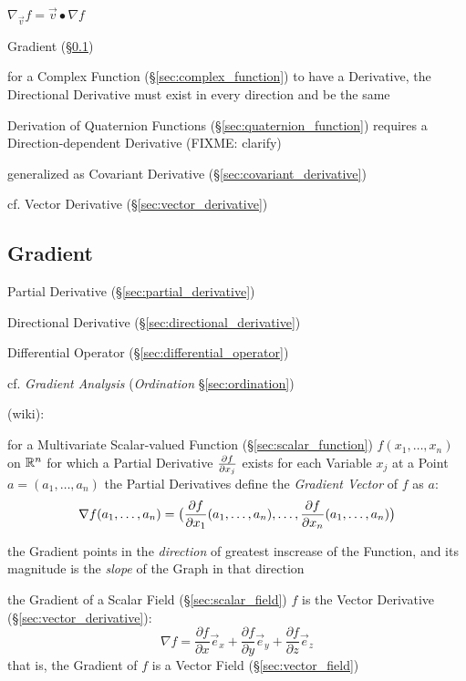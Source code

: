 {$\nabla_{\vec{v}} f = \vec{v}\bullet \nabla{f}$

Gradient (\S\ref{sec:gradient})

for a Complex Function (\S\ref{sec:complex_function}) to have a Derivative, the
Directional Derivative must exist in every direction and be the same

Derivation of Quaternion Functions (\S\ref{sec:quaternion_function}) requires a
Direction-dependent Derivative (FIXME: clarify)

\fist generalized as Covariant Derivative (\S\ref{sec:covariant_derivative})

cf. Vector Derivative (\S\ref{sec:vector_derivative})



\subsection{Gradient}\label{sec:gradient}

Partial Derivative (\S\ref{sec:partial_derivative})

Directional Derivative (\S\ref{sec:directional_derivative})

Differential Operator (\S\ref{sec:differential_operator})

cf. \emph{Gradient Analysis} (\emph{Ordination} \S\ref{sec:ordination})

(wiki):

for a Multivariate Scalar-valued Function (\S\ref{sec:scalar_function}) $f(x_1,
\ldots, x_n)$ on $\mathbb{R}^n$ for which a Partial Derivative $\frac{\partial{f}}{\partial{x_j}}$
exists for each Variable $x_j$ at a Point $a = (a_1, \ldots, a_n)$ the Partial
Derivatives define the \emph{Gradient Vector} of $f$ as $a$:
\[
  \nabla{f}(a_1, \ldots, a_n) = \big( \frac{\partial{f}}{\partial{x_1}}(a_1, \ldots, a_n), \ldots,
  \frac{\partial{f}}{\partial{x_n}}(a_1, \ldots, a_n) \big)
\]

the Gradient points in the \emph{direction} of greatest inscrease of the
Function, and its magnitude is the \emph{slope} of the Graph in that direction

the Gradient of a Scalar Field (\S\ref{sec:scalar_field}) $f$ is the Vector
Derivative (\S\ref{sec:vector_derivative}):
\[
  \nabla f =
    \frac{\partial f}{\partial x}\vec{e}_x +
    \frac{\partial f}{\partial y}\vec{e}_y +
    \frac{\partial f}{\partial z}\vec{e}_z
\]
that is, the Gradient of $f$ is a Vector Field (\S\ref{sec:vector_field})

}
